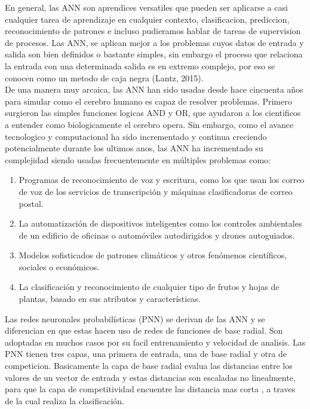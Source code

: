 En general, las ANN son aprendices versatiles que pueden ser aplicarse a casi cualquier tarea de aprendizaje en cualquier contexto, clasificacion, prediccion, reconocimiento de patrones e incluso pudieramos hablar de tareas de supervision de procesos. Las ANN, se aplican mejor a los problemas cuyos datos de entrada y salida son bien definidos o bastante simples, sin embargo el proceso que relaciona la entrada con una determinada salida es en extremo complejo, por eso se conocen como un metodo de caja negra (Lantz, 2015).\\

De una manera muy arcaica, las ANN han sido usadas desde hace cincuenta años para simular como el cerebro humano es capaz de resolver problemas. Primero surgieron las simples funciones logicas AND y OR, que ayudaron a los cientificos a entender como biologicamente el cerebro opera. Sin embargo, como el avance tecnologico y computacional ha sido incrementado y continua creciendo potencialmente durante los ultimos anos, las ANN ha incrementado su complejidad siendo usadas frecuentemente en múltiples problemas como:

\begin{enumerate}
    \item{Programas de reconocimiento de voz y escritura, como los que usan los correo de voz
de los servicios de transcripción y máquinas clasificadoras de correo postal.}
	\item{La automatización de dispositivos inteligentes como los controles ambientales de un edificio de oficinas o automóviles autodirigidos y drones autoguiados.}
	\item{Modelos sofisticados de patrones climáticos y otros fenómenos científicos, sociales o económicos.}
	\item{La clasificaci\'on y reconocimiento de cualquier tipo de frutos y hojas de plantas, basado en sus atributos y características.}
\end{enumerate} 

Las redes neuronales probabil\'isticas (PNN) se derivan de las ANN y se diferencian en que estas hacen uso de redes de funciones de base radial. Son adoptadas en muchos casos por su facil entrenamiento y velocidad de analisis. Las PNN tienen tres capas, una primera de entrada, una de base radial y otra de competicion. Basicamente la capa de base radial evalua las distancias entre los valores de un vector de entrada y estas distancias son escaladas no linealmente, para que la capa de competitividad encuentre las distancia mas corta , a traves de la cual realiza la clasificaci\'on.

